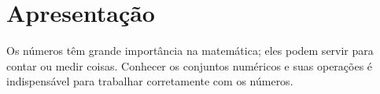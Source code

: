 \section{Apresentação}

Os números têm grande importância na matemática; eles podem servir para contar ou medir coisas. Conhecer os conjuntos numéricos e suas operações é indispensável para trabalhar corretamente com os números.